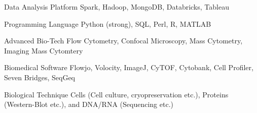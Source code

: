 


\begin{cvskills}


\cvskill
{Data Analysis Platform} %
{Spark, Hadoop, MongoDB, Databricks, Tableau} %


\cvskill
{Programming Language} %
{Python (strong), SQL, Perl, R, MATLAB} %


\cvskill
{Advanced Bio-Tech} %
{Flow Cytometry, Confocal Microscopy, Mass Cytometry, Imaging Mass Cytomtery} %


\cvskill
{Biomedical Software} %
{Flowjo, Volocity, ImageJ, CyTOF, Cytobank, Cell Profiler, Seven
	Bridges, SeqGeq} %


\cvskill
{Biological Technique} %
{Cells (Cell culture, cryopreservation etc.), Proteins (Western-Blot etc.), and DNA/RNA (Sequencing etc.)} %

\end{cvskills}